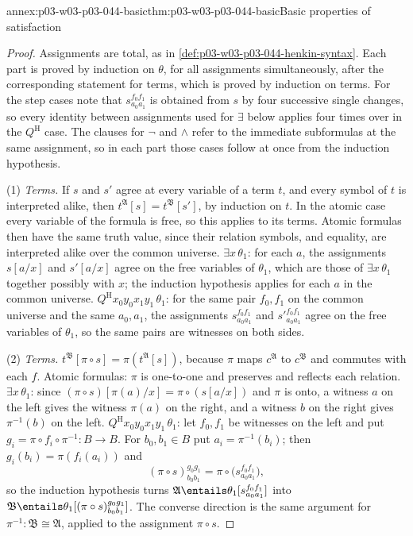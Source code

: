 \begin{annexitem}{annex:p03-w03-p03-044-basic}{thm:p03-w03-p03-044-basic}{Basic properties of satisfaction}
\begin{proof}
Assignments are total, as in \cref{def:p03-w03-p03-044-henkin-syntax}.
Each part is proved by induction on \(\theta\), for all assignments
simultaneously, after the corresponding statement for terms, which is
proved by induction on terms.  For the step cases note that
\(s^{f_0f_1}_{a_0a_1}\) is obtained from \(s\) by four successive single
changes, so every identity between assignments used for \(\exists\) below
applies four times over in the \(Q^{\mathrm H}\) case.  The clauses for
\(\neg\) and \(\land\) refer to the immediate subformulas at the same
assignment, so in each part those cases follow at once from the induction
hypothesis.

(1) \emph{Terms.}  If \(s\) and \(s'\) agree at every variable of a term
\(t\), and every symbol of \(t\) is interpreted alike, then
\(t^{\mathfrak A}[s]=t^{\mathfrak B}[s']\), by induction on \(t\).  In the
atomic case every variable of the formula is free, so this applies to its
terms.  Atomic formulas then have
the same truth value, since their relation symbols, and equality, are
interpreted alike over the common universe.  \(\exists x\,\theta_1\): for
each \(a\), the assignments \(s[a/x]\) and \(s'[a/x]\) agree on the free
variables of \(\theta_1\), which are those of \(\exists x\,\theta_1\)
together possibly with \(x\); the induction hypothesis applies for each
\(a\) in the common universe.  \(Q^{\mathrm H}x_0y_0x_1y_1\,\theta_1\): for
the same pair \(f_0,f_1\) on the common universe and the same
\(a_0,a_1\), the assignments \(s^{f_0f_1}_{a_0a_1}\) and
\(s'^{f_0f_1}_{a_0a_1}\) agree on the free variables of \(\theta_1\), so the
same pairs are witnesses on both sides.

(2) \emph{Terms.}  \(t^{\mathfrak B}[\pi\circ s]=\pi(t^{\mathfrak A}[s])\),
because \(\pi\) maps \(c^{\mathfrak A}\) to \(c^{\mathfrak B}\) and commutes
with each \(f\).  Atomic formulas: \(\pi\) is one-to-one and preserves and
reflects each relation.  \(\exists x\,\theta_1\): since
\((\pi\circ s)[\pi(a)/x]=\pi\circ(s[a/x])\) and \(\pi\) is onto, a witness
\(a\) on the left gives the witness \(\pi(a)\) on the right, and a witness
\(b\) on the right gives \(\pi^{-1}(b)\) on the left.
\(Q^{\mathrm H}x_0y_0x_1y_1\,\theta_1\): let \(f_0,f_1\) be witnesses on the
left and put \(g_i=\pi\circ f_i\circ\pi^{-1}:B\to B\).  For
\(b_0,b_1\in B\) put \(a_i=\pi^{-1}(b_i)\); then \(g_i(b_i)=\pi(f_i(a_i))\)
and
\[
 (\pi\circ s)^{g_0g_1}_{b_0b_1}=\pi\circ\bigl(s^{f_0f_1}_{a_0a_1}\bigr),
\]
so the induction hypothesis turns
\(\mathfrak A\entails\theta_1[s^{f_0f_1}_{a_0a_1}]\) into
\(\mathfrak B\entails\theta_1[(\pi\circ s)^{g_0g_1}_{b_0b_1}]\).  The
converse direction is the same argument for \(\pi^{-1}:\mathfrak B\cong
\mathfrak A\), applied to the assignment \(\pi\circ s\).


\end{proof}
\end{annexitem}
